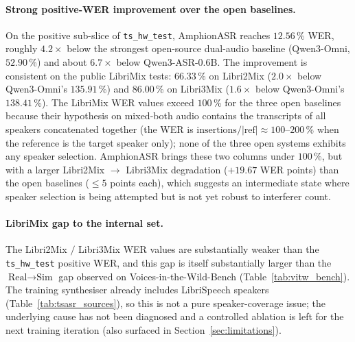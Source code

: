 \paragraph{Strong positive-WER improvement over the open baselines.}
On the positive sub-slice of \texttt{ts\_hw\_test}, AmphionASR
reaches $12.56$\,\% WER, roughly $4.2\times$ below the strongest
open-source dual-audio baseline (Qwen3-Omni, $52.90$\,\%) and
about $6.7\times$ below Qwen3-ASR-0.6B. The improvement is
consistent on the public LibriMix tests: $66.33$\,\% on Libri2Mix
($2.0\times$ below Qwen3-Omni's $135.91$\,\%) and $86.00$\,\% on
Libri3Mix ($1.6\times$ below Qwen3-Omni's $138.41$\,\%). The
LibriMix WER values exceed $100$\,\% for the three open baselines
because their hypothesis on mixed-both audio contains the
transcripts of all speakers concatenated together (the WER is
$\text{insertions}/|\text{ref}| \approx 100$--$200$\,\% when the
reference is the target speaker only); none of the three open
systems exhibits any speaker selection. AmphionASR brings these
two columns under $100$\,\%, but with a larger Libri2Mix
$\to$ Libri3Mix degradation ($+19.67$ WER points) than the
open baselines ($\le 5$ points each), which suggests an
intermediate state where speaker selection is being attempted but
is not yet robust to interferer count.

\paragraph{LibriMix gap to the internal set.}
The Libri2Mix $/$ Libri3Mix WER values are substantially weaker
than the \texttt{ts\_hw\_test} positive WER, and this gap is
itself substantially larger than the $\text{Real}\!\to\!\text{Sim}$
gap observed on Voices-in-the-Wild-Bench
(Table~\ref{tab:vitw_bench}). The training synthesiser already
includes LibriSpeech speakers
(Table~\ref{tab:tsasr_sources}), so this is not a pure
speaker-coverage issue; the underlying cause has not been
diagnosed and a controlled ablation is left for the next training
iteration (also surfaced in Section~\ref{sec:limitations}).

